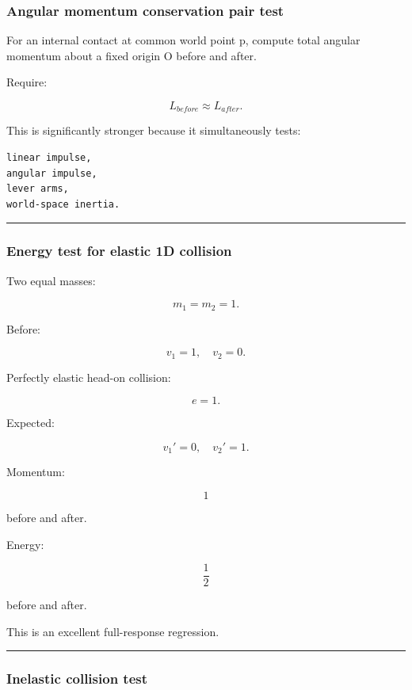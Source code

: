 \subsubsection{Angular momentum conservation pair test}\label{angular-momentum-conservation-pair-test}

For an internal contact at common world point p, compute total angular momentum about a fixed origin O before and after.

Require:

\[
L_{before}\approx L_{after}.
\]

This is significantly stronger because it simultaneously tests:

\begin{verbatim}
linear impulse,
angular impulse,
lever arms,
world-space inertia.
\end{verbatim}

\begin{center}\rule{0.5\linewidth}{0.5pt}\end{center}

\subsubsection{Energy test for elastic 1D collision}\label{energy-test-for-elastic-1d-collision}

Two equal masses:

\[
m_1=m_2=1.
\]

Before:

\[
v_1=1,\quad v_2=0.
\]

Perfectly elastic head-on collision:

\[
e=1.
\]

Expected:

\[
v_1'=0,
\quad
v_2'=1.
\]

Momentum:

\[
1
\]

before and after.

Energy:

\[
\frac12
\]

before and after.

This is an excellent full-response regression.

\begin{center}\rule{0.5\linewidth}{0.5pt}\end{center}

\subsubsection{Inelastic collision test}\label{inelastic-collision-test}

